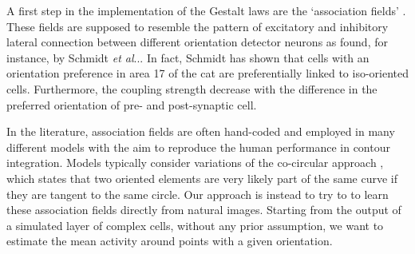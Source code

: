 \documentclass{llncs}
\makeatletter
\DeclareRobustCommand\onedot{\futurelet\@let@token\@onedot}
\def\@onedot{\ifx\@let@token.\else.\null\fi\xspace}
\def\etal{\emph{et al}\onedot}
\makeatother
\begin{document}


A first step in the implementation of the Gestalt laws are the `association fields'
\cite{FieldHH93}. These fields are supposed to resemble the pattern of
excitatory and inhibitory lateral connection between different orientation
detector neurons as found, for instance, by Schmidt \etal \cite{SchmidtGLS97}.
In fact, Schmidt has shown that cells with an orientation preference in area
17 of the cat are preferentially linked to iso-oriented cells. Furthermore,
the coupling strength decrease with the difference in the preferred
orientation of pre- and post-synaptic cell.

In the literature, association fields are often hand-coded and employed in
many different models with the aim to reproduce the human performance in
contour integration. Models typically consider variations of the co-circular
approach \cite{Grossberg85,Guy96,Li98}, which states that two oriented elements are
very likely part of the same curve if they are tangent to the same circle.
Our approach is instead to try to to learn these
association fields directly from natural images. 
Starting from the output of a simulated layer of complex cells,
without any prior assumption, we want to estimate the mean
activity around points with a given orientation.


\end{document}
